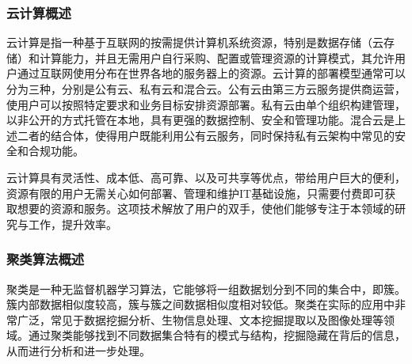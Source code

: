 \subsubsection{云计算概述}
云计算是指一种基于互联网的按需提供计算机系统资源，特别是数据存储（云存储）和计算能力，并且无需用户自行采购、配置或管理资源的计算模式，其允许用户通过互联网使用分布在世界各地的服务器上的资源\cite{montazerolghaem2020green}。云计算的部署模型通常可以分为三种，分别是公有云、私有云和混合云。公有云由第三方云服务提供商运营，使用户可以按照特定要求和业务目标安排资源部署。私有云由单个组织构建管理，以非公开的方式托管在本地，具有更强的数据控制、安全和管理功能。混合云是上述二者的结合体，使得用户既能利用公有云服务，同时保持私有云架构中常见的安全和合规功能。

云计算具有灵活性、成本低、高可靠、以及可共享等优点，带给用户巨大的便利，资源有限的用户无需关心如何部署、管理和维护IT基础设施，只需要付费即可获取想要的资源和服务。这项技术解放了用户的双手，使他们能够专注于本领域的研究与工作，提升效率。

\subsubsection{聚类算法概述}
聚类是一种无监督机器学习算法，它能够将一组数据划分到不同的集合中，即簇。簇内部数据相似度较高，簇与簇之间数据相似度相对较低。聚类在实际的应用中非常广泛，常见于数据挖掘分析、生物信息处理、文本挖掘提取以及图像处理等领域。通过聚类能够找到不同数据集合特有的模式与结构，挖掘隐藏在背后的信息，从而进行分析和进一步处理。

